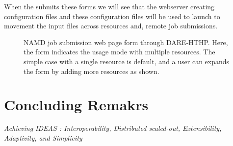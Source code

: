 \documentclass{sig-alternate}
\begin{document}
When the submits these forms we will see that the webserver creating configuration files and 
these configuration files will be used to launch to movement the input files across resources and,
remote job submissions.

\begin{figure}
 \centering
\caption{\small NAMD job submission web page form through DARE-HTHP. Here, the form indicates the usage mode with multiple resources.  The simple case with a single resource is default, and a user can expands the form by adding more resources as shown.}
  \label{fig:NAMD2}
\end{figure}


\section{Concluding Remakrs}

\textit{Achieving IDEAS : Interoperability, Distributed
  scaled-out, Extensibility, Adaptivity, and Simplicity}

  
\end{document}
